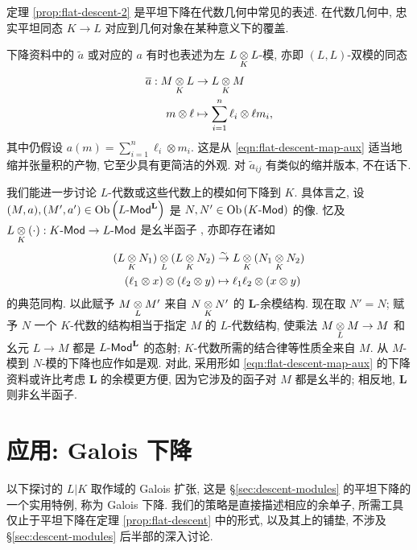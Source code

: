 定理 \ref{prop:flat-descent-2} 是平坦下降在代数几何中常见的表述. 在代数几何中, 忠实平坦同态 $K \to L$ 对应到几何对象在某种意义下的覆盖.

下降资料中的 $\tilde{a}$ 或对应的 $a$ 有时也表述为左 $L \underset{K}{\otimes} L$-模, 亦即 $(L, L)$-双模的同态
\begin{align*}
	\overline{a}: M \underset{K}{\otimes} L & \to L \underset{K}{\otimes} M \\
	m \otimes \ell & \mapsto \sum_{i=1}^n \ell_i \otimes \ell m_i ,
\end{align*}
其中仍假设 $a(m) = \sum_{i=1}^n \ell_i \otimes m_i$. 这是从 \eqref{eqn:flat-descent-map-aux} 适当地缩并张量积的产物, 它至少具有更简洁的外观. 对 $\tilde{a}_{ij}$ 有类似的缩并版本, 不在话下.

\begin{remark}[代数和模的平坦下降]\label{rem:flat-descent-alg}
	我们能进一步讨论 $L$-代数或这些代数上的模如何下降到 $K$. 具体言之, 设 $(M, a), (M', a') \in \operatorname{Ob}\left(L\text{-}\mathsf{Mod}^{\mathbf{L}}\right)$ 是 $N, N' \in \operatorname{Ob}\left(K\text{-}\mathsf{Mod}\right)$ 的像. 忆及 $L \underset{K}{\otimes} (\cdot): K\text{-}\mathsf{Mod} \to L\text{-}\mathsf{Mod}$ 是幺半函子 \cite[命题 6.6.10]{Li1}, 亦即存在诸如
	\begin{equation}\label{eqn:change-of-ring-monoidal}\begin{aligned}
			(L \underset{K}{\otimes} N_1) \underset{L}{\otimes} (L \underset{K}{\otimes} N_2) & \stackrel{\sim}{\rightarrow} L \underset{K}{\otimes} (N_1 \underset{K}{\otimes} N_2) \\
			(\ell_1 \otimes x) \otimes (\ell_2 \otimes y) & \mapsto \ell_1 \ell_2 \otimes (x \otimes y)
	\end{aligned}\end{equation}
	的典范同构. 以此赋予 $M \underset{L}{\otimes} M'$ 来自 $N \underset{K}{\otimes} N'$ 的 $\mathbf{L}$-余模结构. 现在取 $N' = N$; 赋予 $N$ 一个 $K$-代数的结构相当于指定 $M$ 的 $L$-代数结构, 使乘法 $M \underset{L}{\otimes} M \to M$ 和幺元 $L \to M$ 都是 $L\text{-}\mathsf{Mod}^{\mathbf{L}}$ 的态射; $K$-代数所需的结合律等性质全来自 $M$. 从 $M$-模到 $N$-模的下降也应作如是观. 对此, 采用形如 \eqref{eqn:flat-descent-map-aux} 的下降资料或许比考虑 $\mathbf{L}$ 的余模更方便, 因为它涉及的函子对 $M$ 都是幺半的; 相反地, $\mathbf{L}$ 则非幺半函子.
\end{remark}

\section{应用: Galois 下降}\label{sec:descent-Galois}
以下探讨的 $L|K$ 取作域的 Galois 扩张, 这是 \S\ref{sec:descent-modules} 的平坦下降的一个实用特例, 称为 Galois 下降. 我们的策略是直接描述相应的余单子, 所需工具仅止于平坦下降在定理 \ref{prop:flat-descent} 中的形式, 以及其上的铺垫, 不涉及 \S\ref{sec:descent-modules} 后半部的深入讨论.

